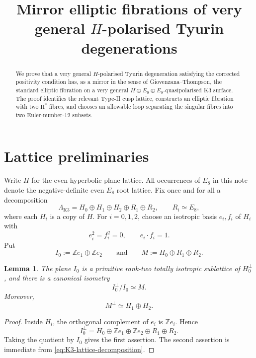 \documentclass[11pt]{amsart}
\newtheorem{lemma}[theorem]{Lemma}
\theoremstyle{definition}
\newcommand{\ZZ}{\mathbb Z}
\begin{document}
\title[Mirror partners of $H$-polarised Tyurin degenerations]
{Mirror elliptic fibrations of very general $H$-polarised Tyurin
degenerations}

\begin{abstract}
We prove that a very general $H$-polarised Tyurin degeneration satisfying the
corrected positivity condition has, as a mirror in the sense of
Giovenzana--Thompson, the standard elliptic fibration on a very general
$H\oplus E_8\oplus E_8$-quasipolarised K3 surface.  The proof identifies the
relevant Type-II cusp lattice, constructs an elliptic fibration with two
$\mathrm{II}^*$ fibres, and chooses an allowable loop separating the singular
fibres into two Euler-number-$12$ subsets.
\end{abstract}

\maketitle

\section{Lattice preliminaries}

Write $H$ for the even hyperbolic plane lattice.  All occurrences of $E_8$ in
this note denote the negative-definite even $E_8$ root lattice.  Fix once and
for all a decomposition
\begin{equation}\label{eq:K3-lattice-decomposition}
\Lambda_{\mathrm{K3}}
 =
H_0\oplus H_1\oplus H_2\oplus R_1\oplus R_2,
\qquad R_i\simeq E_8,
\end{equation}
where each $H_i$ is a copy of $H$.  For $i=0,1,2$, choose an isotropic basis
$e_i,f_i$ of $H_i$ with
\[
e_i^2=f_i^2=0,\qquad e_i\cdot f_i=1.
\]
Put
\[
I_0:=\ZZ e_1\oplus \ZZ e_2
\qquad\text{and}\qquad
M:=H_0\oplus R_1\oplus R_2.
\]

\begin{lemma}\label{lem:standard-plane}
The plane $I_0$ is a primitive rank-two totally isotropic sublattice of
$H_0^\perp$, and there is a canonical isometry
\[
I_0^\perp/I_0\simeq M.
\]
Moreover,
\[
M^\perp\simeq H_1\oplus H_2.
\]
\end{lemma}

\begin{proof}
Inside $H_i$, the orthogonal complement of $e_i$ is $\ZZ e_i$.  Hence
\[
I_0^\perp
 =
H_0\oplus \ZZ e_1\oplus \ZZ e_2\oplus R_1\oplus R_2.
\]
Taking the quotient by $I_0$ gives the first assertion.  The second assertion
is immediate from \eqref{eq:K3-lattice-decomposition}.
\end{proof}
\end{document}
